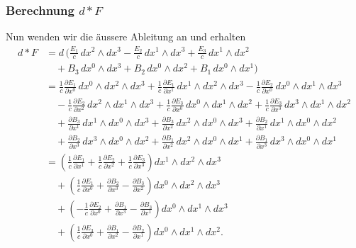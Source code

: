 \subsubsection{Berechnung $d {\ast} F$}
Nun wenden wir die äussere Ableitung an und erhalten
\begin{align*}
	d{\ast} F
	&= d \, \Bigg(
	\frac{E_{1}}{c} \, dx^2 \wedge dx^3
	- \frac{E_{2}}{c} \, dx^1 \wedge dx^3
	+ \frac{E_{3}}{c} \, dx^1 \wedge dx^2 \\
	&\quad
	+ B_3 \, dx^0 \wedge dx^3
	+ B_2 \, dx^0 \wedge dx^2
	+ B_1 \, dx^0 \wedge dx^1
	\Bigg) \\[1ex]
	&= \frac{1}{c} \frac{\partial E_1}{\partial x^0} \, dx^0 \wedge dx^2 \wedge dx^3
	+ \frac{1}{c} \frac{\partial E_1}{\partial x^1} \, dx^1 \wedge dx^2 \wedge dx^3
	- \frac{1}{c} \frac{\partial E_2}{\partial x^0} \, dx^0 \wedge dx^1 \wedge dx^3 \\
	&\quad
	- \frac{1}{c} \frac{\partial E_2}{\partial x^2} \, dx^2 \wedge dx^1 \wedge dx^3
	+ \frac{1}{c} \frac{\partial E_3}{\partial x^0} \, dx^0 \wedge dx^1 \wedge dx^2
	+ \frac{1}{c} \frac{\partial E_3}{\partial x^3} \, dx^3 \wedge dx^1 \wedge dx^2 \\
	&\quad
	+ \frac{\partial B_3}{\partial x^1} \, dx^1 \wedge dx^0 \wedge dx^3
	+ \frac{\partial B_3}{\partial x^2} \, dx^2 \wedge dx^0 \wedge dx^3
	+ \frac{\partial B_2}{\partial x^1} \, dx^1 \wedge dx^0 \wedge dx^2 \\
	&\quad
	+ \frac{\partial B_2}{\partial x^3} \, dx^3 \wedge dx^0 \wedge dx^2
	+ \frac{\partial B_1}{\partial x^2} \, dx^2 \wedge dx^0 \wedge dx^1
	+ \frac{\partial B_1}{\partial x^3} \, dx^3 \wedge dx^0 \wedge dx^1 \\[2ex]
	&= \left(
	\frac{1}{c} \frac{\partial E_1}{\partial x^1}
	+ \frac{1}{c} \frac{\partial E_2}{\partial x^2}
	+ \frac{1}{c} \frac{\partial E_3}{\partial x^3}
	\right) dx^1 \wedge dx^2 \wedge dx^3 \\
	&\quad
	+ \left(
	\frac{1}{c} \frac{\partial E_1}{\partial x^0}
	+ \frac{\partial B_2}{\partial x^3}
	- \frac{\partial B_3}{\partial x^2}
	\right) dx^0 \wedge dx^2 \wedge dx^3 \\
	&\quad
	+ \left(
	-\frac{1}{c} \frac{\partial E_2}{\partial x^0}
	+ \frac{\partial B_1}{\partial x^3}
	- \frac{\partial B_3}{\partial x^1}
	\right) dx^0 \wedge dx^1 \wedge dx^3 \\
	&\quad
	+ \left(
	\frac{1}{c} \frac{\partial E_3}{\partial x^0}
	+ \frac{\partial B_1}{\partial x^2}
	- \frac{\partial B_2}{\partial x^1}
	\right) dx^0 \wedge dx^1 \wedge dx^2.
\end{align*}
